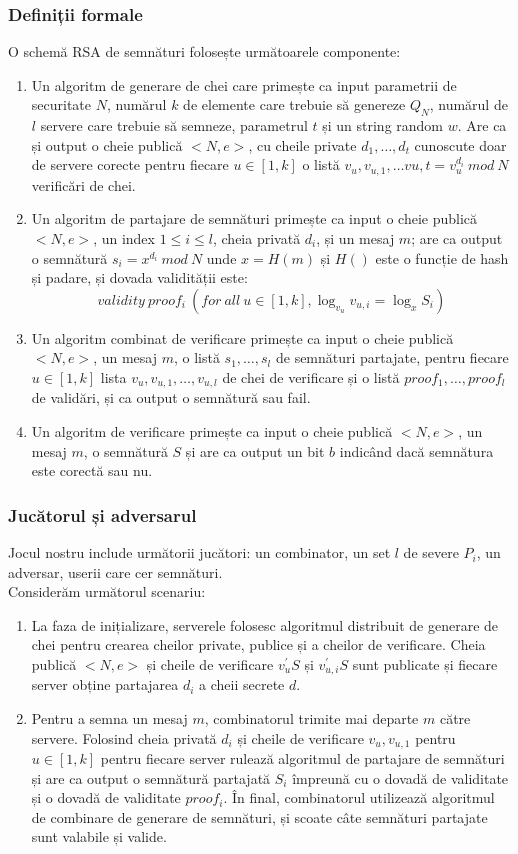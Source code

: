 \documentclass[12]{report}
\begin{document}
\subsubsection{Definiții formale}
O schemă RSA de semnături folosește următoarele componente:
\begin{enumerate}
\item Un algoritm de generare de chei care primește ca input parametrii de securitate $N$, numărul $k$ de elemente care trebuie să genereze $Q_N$, numărul de $l$ servere care trebuie să semneze, parametrul $t$ și un string random $w$. Are ca și output o cheie publică $<N,e>$, cu cheile private $d_1, \dots ,d_t$ cunoscute doar de servere corecte pentru fiecare $u \in [1,k]$ o listă $v_u,v_{u,1}, \dots v{u,t}=v_{u}^{d_i} \ mod \ N$ verificări de chei. 
\item Un algoritm de partajare de semnături primește ca input o cheie publică $<N,e>$, un index $ 1\leq i \leq l$, cheia privată $d_i$, și un mesaj $m$; are ca output o semnătură $s_i = x^{d_i} \ mod \ N$ unde $x=H(m)$ și $H()$ este o funcție de hash și padare, și dovada validității este:
$$ validity \ proof_i \ (for \ all \ u \in [1,k], \log_{v_u} v_{u,i}=\log_x S_i)$$
\item Un algoritm combinat de verificare primește ca input o cheie publică $<N,e>$, un mesaj $m$, o listă $s_1, \dots ,s_l$ de semnături partajate, pentru fiecare $u \in [1,k]$ lista $v_u,v_{u,1}, \dots ,v_{u,l}$ de chei de verificare și o listă $proof_1, \dots ,proof_l$ de validări, și ca output o semnătură sau fail.
\item Un algoritm de verificare primește ca input o cheie publică $<N,e>$, un mesaj $m$, o semnătură $S$ și are ca output un bit $b$ indicând dacă semnătura este corectă sau nu.
\end{enumerate}
\subsubsection{Jucătorul și adversarul}
Jocul nostru include următorii jucători: un combinator, un set $l$ de severe $P_i$, un adversar, userii care cer semnături.\\
Considerăm următorul scenariu: \\
\begin{enumerate}
\item La faza de inițializare, serverele folosesc algoritmul distribuit de generare de chei pentru crearea cheilor private, publice și a cheilor de verificare. Cheia publică $<N,e>$ și cheile de verificare $v_{u}^{'}S$ și $v_{u,i}^{'}S$ sunt publicate și fiecare server obține partajarea $d_i$ a cheii secrete $d$.
\item Pentru a semna un mesaj $m$, combinatorul trimite mai departe $m$ către servere. Folosind cheia privată $d_i$ și cheile de verificare $v_u,v_{u,1}$ pentru $u \in [1,k]$ pentru fiecare server rulează algoritmul de partajare de semnături și are ca output o semnătură partajată $S_i$ împreună cu o dovadă de validitate și o dovadă de validitate $proof_i$. În final, combinatorul utilizează algoritmul de combinare de generare de semnături, și scoate câte semnături partajate sunt valabile și valide.
\end{enumerate}
\end{document}
